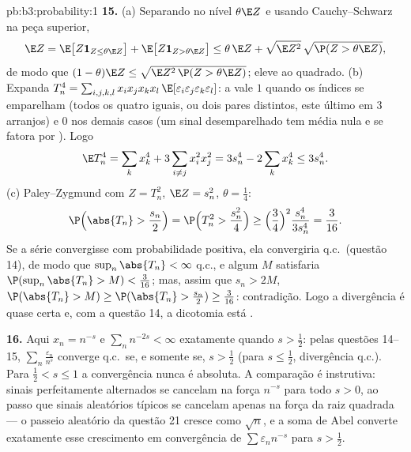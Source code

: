 \begin{solution}{pb:b3:probability:1}
\textbf{15.} (a) Separando no nível $\theta\E Z$ e
usando Cauchy--Schwarz na peça superior,
\[
\E Z = \E\bigl[Z\mathbf 1_{Z \leq \theta\E Z}\bigr] +
\E\bigl[Z\mathbf 1_{Z > \theta\E Z}\bigr]
\leq \theta\,\E Z + \sqrt{\E Z^2}\,
\sqrt{\P(Z > \theta\E Z)} ,
\]
de modo que $(1 - \theta)\E Z \leq \sqrt{\E Z^2\,\P(Z > \theta\E
Z)}$; eleve ao quadrado. (b) Expanda $T_n^4 =
\sum_{i,j,k,l}x_ix_jx_kx_l\,
\E[\varepsilon_i\varepsilon_j\varepsilon_k\varepsilon_l]$:
a  vale $1$ quando os índices se emparelham (todos os quatro
iguais, ou dois pares distintos, este último em $3$
arranjos) e $0$ nos demais casos (um sinal desemparelhado tem média nula
e se fatora por ). Logo
\[
\E T_n^4 = \sum_kx_k^4 + 3\sum_{i\neq j}x_i^2x_j^2 =
3s_n^4 - 2\sum_kx_k^4 \leq 3s_n^4 .
\]
(c) Paley--Zygmund com $Z = T_n^2$, $\E Z = s_n^2$,
$\theta = \frac14$:
\[
\P\Bigl(\abs{T_n} > \frac{s_n}2\Bigr) = \P\Bigl(T_n^2 >
\frac{s_n^2}4\Bigr) \geq \Bigl(\frac34\Bigr)^2
\frac{s_n^4}{3s_n^4} = \frac3{16} .
\]
Se a série convergisse com probabilidade positiva, ela
convergiria q.c.\ (questão 14), de modo que $\sup_n\abs{T_n} <
\infty$ q.c., e algum $M$ satisfaria
$\P(\sup_n\abs{T_n} > M) < \frac3{16}$; mas, assim que $s_n
> 2M$, $\P(\abs{T_n} > M) \geq \P(\abs{T_n} > \frac{s_n}2)
\geq \frac3{16}$: contradição. Logo a divergência é quase
certa e, com a questão 14, a dicotomia está .

\textbf{16.} Aqui $x_n = n^{-s}$ e $\sum_nn^{-2s} <
\infty$ exatamente quando $s > \frac12$: pelas questões 14--15,
$\sum_n\frac{\varepsilon_n}{n^s}$ converge q.c.\ se, e
somente se, $s > \frac12$ (para $s \leq \frac12$, divergência
q.c.). Para $\frac12 < s \leq 1$ a convergência nunca é
absoluta. A comparação é instrutiva: sinais perfeitamente
alternados se cancelam na força $n^{-s}$ para todo $s
> 0$, ao passo que sinais aleatórios típicos se cancelam apenas na
força da raiz quadrada --- o passeio aleatório da questão 21
cresce como $\sqrt n$, e a soma de Abel converte exatamente
esse crescimento em convergência de $\sum\varepsilon_nn^{-s}$
para $s > \frac12$.


\end{solution}
